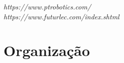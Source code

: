 {\it https://www.ptrobotics.com/} \\
{\it https://www.futurlec.com/index.shtml} \\








\newpage
\section{Organização}
\newpage
